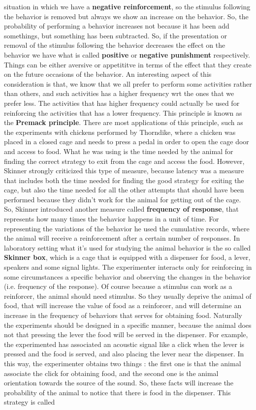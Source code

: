 \documentclass[11pt]{article}
\begin{document}
situation in which we have a \textbf{negative reinforcement}, so the stimulus following the behavior is removed but always we show an increase on the behavior. So, the probability of performing a behavior increases not because it has been add somethings, but something has been subtracted. So, if the presentation or removal of the stimulus following the behavior decreases the effect on the behavior we have what is called \textbf{positive} or \textbf{negative punishment} respectively. Things can be either aversive or appetititve in terms of the effect that they create on the future occasions of the behavior. An interesting aspect of this consideration is that, we know that we all prefer to perform some activities rather than others, and such activities has a higher frequency wrt the ones that we prefer less. The activities that has higher frequency could actually be used for reinforcing the activities that has a lower frequency. This principle is known as the \textbf{Premack principle}. There are most applications of this principle, such as the experiments with chickens performed by Thorndike, where a chicken was placed in a closed cage and needs to press a pedal in order to open the cage door and access to food. What he was using is the time needed by the animal for finding the correct strategy to exit from the cage and access the food. However, Skinner strongly criticized this type of measure, because latency was a measure that includes both the time needed for finding the good strategy for exiting the cage, but also the time needed for all the other attempts that should have been performed because they didn't work for the animal for getting out of the cage. So, Skinner introduced another measure called \textbf{frequency of response}, that represents how many times the behavior happens in a unit of time. For representing the variations of the behavior he used the cumulative records, where the animal will receive a reinforcement after a certain number of responses. In laboratory setting what it's used for studying the animal behavior is the so called \textbf{Skinner box}, which is a cage that is equipped with a dispenser for food, a lever, speakers and some signal lights. The experimenter interacts only for reinforcing in some circumstances a specific behavior and observing the changes in the behavior (i.e. frequency of the response). Of course because a stimulus can work as a reinforcer, the animal should need stimulus. So they usually deprive the animal of food, that will increase the value of food as a reinforcer, and will determine an increase in the frequency of behaviors that serves for obtaining food. Naturally the experiments should be designed in a specific manner, because the animal does not that pressing the lever the food will be served in the dispenser. For example, the experimented has associated an acoustic signal like a click when the lever is pressed and the food is served, and also placing the lever near the dispenser. In this way, the experimenter obtains two things : the first one is that the animal associate the click for obtaining food, and the second one is the animal orientation towards the source of the sound. So, these facts will increase the probability of the animal to notice that there is food in the dispenser. This strategy is called 
\end{document}
